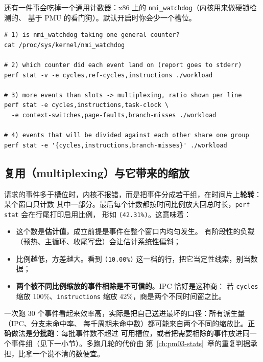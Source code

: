 \documentclass[12pt,a4paper,fontset=fandol]{ctexbook}
\newcommand{\Tp}[1]{\texttt{#1}}
\newcommand{\Bk}{\discretionary{}{}{}}
\newcommand{\Mx}[1]{\textsf{#1}}
\begin{document}
还有一件事会吃掉一个通用计数器：x86 上的 \Tp{nmi{\Bk}\_watchdog}（内核用来做硬锁检测的、
基于 PMU 的看门狗）。默认开启时你会少一个槽位。

\begin{lstlisting}[style=shellstyle, title={槽位、分配、复用与分组：四步自查（Linux）}]
# 1) is nmi_watchdog taking one general counter?
cat /proc/sys/kernel/nmi_watchdog

# 2) which counter did each event land on (report goes to stderr)
perf stat -v -e cycles,ref-cycles,instructions ./workload

# 3) more events than slots -> multiplexing, ratio shown per line
perf stat -e cycles,instructions,task-clock \
  -e context-switches,page-faults,branch-misses ./workload

# 4) events that will be divided against each other share one group
perf stat -e '{cycles,instructions,branch-misses}' ./workload
\end{lstlisting}

\subsection*{复用（multiplexing）与它带来的缩放}

请求的事件多于槽位时，内核不报错，而是把事件分成若干组，在时间片上\textbf{轮转}：某个窗口只计数
其中一部分。最后每个计数都按时间比例放大回总时长，\Tp{perf stat} 会在行尾打印启用比例，
形如 \Tp{(42.31\%)}。这意味着：

\begin{itemize}
  \item 这个数是\textbf{估计值}，成立前提是事件在整个窗口内均匀发生。
        有阶段性的负载（预热、主循环、收尾写盘）会让估计系统性偏斜；
  \item 比例越低，方差越大。看到 \Tp{(10.00\%)} 这一档的行，把它当定性线索，别当数据；
  \item \textbf{两个被不同比例缩放的事件相除是不可信的}。\Mx{IPC} 恰好是这种商：
        若 \Tp{cycles} 缩放 100\%、\Tp{instructions} 缩放 42\%，商是两个不同时间窗之比。
\end{itemize}

\begin{warning}[title={缩放比例不同的两个事件相除}]
一次跑 30 个事件看起来效率高，实际是把自己送进最坏的口径：所有派生量（\Mx{IPC}、分支未命中率、
每千周期未命中数）都可能来自两个不同的缩放比。正确做法是\textbf{分批跑}：每批事件数不超过
可用槽位，或者把需要相除的事件放进同一个事件组（见下一小节）。多跑几轮的代价由
第~\ref{ch:pm03-stats}~章的重复判据承担，比拿一个说不清的数便宜。
\end{warning}
\end{document}
